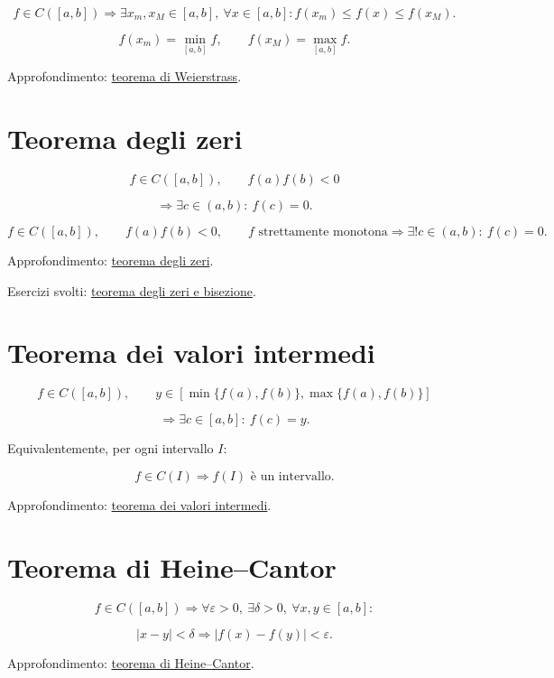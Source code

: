\[
f\in C([a,b])
\Longrightarrow
\exists x_m,x_M\in[a,b],\ \forall x\in[a,b]:
f(x_m)\le f(x)\le f(x_M).
\]

\[
f(x_m)=\min_{[a,b]}f,
\qquad
f(x_M)=\max_{[a,b]}f.
\]

Approfondimento: \href{https://ingegnerismo.it/matematica/teorema-di-weierstrass/}{teorema di Weierstrass}.

\section{Teorema degli zeri}\label{teorema-degli-zeri}

\[
f\in C([a,b]),
\qquad
f(a)f(b)<0
\]

\[
\Longrightarrow
\exists c\in(a,b):\ f(c)=0.
\]

\[
f\in C([a,b]),
\qquad
f(a)f(b)<0,
\qquad
f\text{ strettamente monotona}
\Longrightarrow
\exists!c\in(a,b):\ f(c)=0.
\]

Approfondimento: \href{https://ingegnerismo.it/matematica/teorema-degli-zeri/}{teorema degli zeri}.

Esercizi svolti: \href{https://ingegnerismo.it/matematica/teorema-degli-zeri-esercizi/}{teorema degli zeri e bisezione}.

\section{Teorema dei valori intermedi}\label{teorema-dei-valori-intermedi}

\[
f\in C([a,b]),
\qquad
y\in[\min\{f(a),f(b)\},\max\{f(a),f(b)\}]
\]

\[
\Longrightarrow
\exists c\in[a,b]:\ f(c)=y.
\]

Equivalentemente, per ogni intervallo \(I\):

\[
f\in C(I)
\Longrightarrow
f(I)\text{ è un intervallo}.
\]

Approfondimento: \href{https://ingegnerismo.it/matematica/teorema-dei-valori-intermedi/}{teorema dei valori intermedi}.

\section{Teorema di Heine--Cantor}\label{teorema-di-heinecantor}

\[
f\in C([a,b])
\Longrightarrow
\forall\varepsilon>0,\ \exists\delta>0,\ \forall x,y\in[a,b]:
\]

\[
|x-y|<\delta
\Rightarrow
|f(x)-f(y)|<\varepsilon.
\]

Approfondimento: \href{https://ingegnerismo.it/matematica/teorema-di-heine-cantor/}{teorema di Heine--Cantor}.
